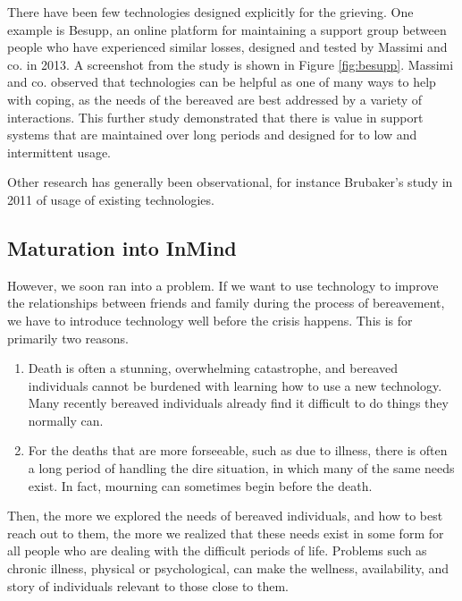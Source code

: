    There have been few technologies designed explicitly for the grieving. One
    example is Besupp, an online platform for maintaining a support group between
    people who have experienced similar losses, designed and tested by Massimi and
    co. in 2013. \cite{mm13}
    A screenshot from the study is shown in Figure \ref{fig:besupp}.
    Massimi and co. observed that technologies can be helpful as
    one of many ways to help with coping, as the needs of the bereaved are best
    addressed by a variety of interactions.
    This further study demonstrated that
    there is value in support systems that are maintained over long periods and
    designed for to low and intermittent usage.

    Other research has generally been observational, for instance Brubaker's study
    in 2011 of usage of existing technologies. \cite{brubaker11}

  \subsection{Maturation into InMind}
    However, we soon ran into a problem.
    If we want to use technology to improve the relationships between friends and family during the
    process of bereavement, we have to introduce technology well before the crisis happens.
    This is for primarily two reasons.
    \begin{enumerate}
    \item Death is often a stunning, overwhelming catastrophe,
    and bereaved individuals cannot be burdened with learning how to use a new technology.
    Many recently bereaved individuals already find it difficult to do things they normally can. \cite{??}
    \item For the deaths that are more forseeable, such as due to illness,
    there is often a long period of handling the dire situation,
    in which many of the same needs exist.
    In fact, mourning can sometimes begin before the death. \cite{??}
    \end{enumerate}

    Then, the more we explored the needs of bereaved individuals,
    and how to best reach out to them, the more we realized that these needs exist in some form
    for all people who are dealing with the difficult periods of life.
    Problems such as chronic illness, physical or psychological,
    can make the wellness, availability, and story of individuals relevant to those
    close to them.

